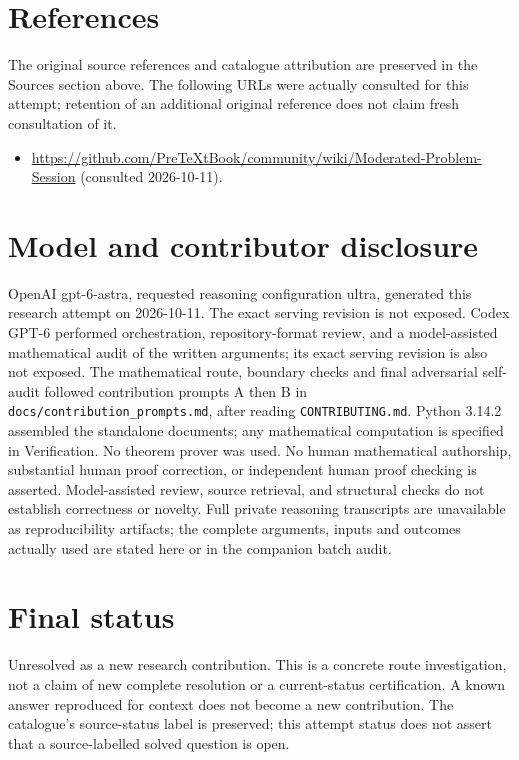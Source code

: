 \documentclass[11pt]{article}
\begin{document}
\section{References}
The original source references and catalogue attribution are preserved in the
Sources section above. The following URLs were actually consulted for this attempt;
retention of an additional original reference does not claim fresh consultation of it.
\begin{itemize}
\item \url{https://github.com/PreTeXtBook/community/wiki/Moderated-Problem-Session} (consulted 2026-10-11). 
\end{itemize}
\section{Model and contributor disclosure}
OpenAI gpt-6-astra, requested reasoning configuration ultra, generated this research
attempt on 2026-10-11. The exact serving revision is not exposed. Codex GPT-6
performed orchestration, repository-format review, and a model-assisted mathematical
audit of the written arguments; its exact serving revision
is also not exposed. The mathematical route, boundary checks and final adversarial
self-audit followed contribution prompts A then B in
\texttt{docs/contribution\_prompts.md}, after reading \texttt{CONTRIBUTING.md}.
Python 3.14.2 assembled the standalone documents; any mathematical computation is
specified in Verification. No theorem prover was used. No human mathematical
authorship, substantial human proof correction, or independent human proof checking
is asserted. Model-assisted review, source retrieval, and structural checks do not
establish correctness or novelty. Full private reasoning transcripts are unavailable
as reproducibility artifacts; the complete arguments, inputs and outcomes actually
used are stated here or in the companion batch audit.
\section{Final status}
Unresolved as a new research contribution. This is a concrete route investigation,
not a claim of new complete resolution or a current-status certification. A known
answer reproduced for context does not become a new contribution. The catalogue's
source-status label is preserved; this attempt status does not assert that a
source-labelled solved question is open.
\end{document}

